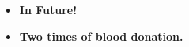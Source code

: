 \threecolumnsection%
	{
		\begin{skills}
		\end{skills}
	}
	{
		\vspace{1em}
		\begin{itemize}
			\item \textbf{In Future!}
		\end{itemize}
	}
	{
		\vspace{1em}
		\begin{itemize}
			\item \textbf{Two times of blood donation.}
		\end{itemize}
	}
